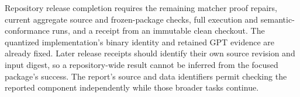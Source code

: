 Repository release completion requires the remaining matcher proof repairs, current aggregate source and frozen-package checks, full execution and semantic-conformance runs, and a receipt from an immutable clean checkout.  The quantized implementation's binary identity and retained GPT evidence are already fixed.  Later release receipts should identify their own source revision and input digest, so a repository-wide result cannot be inferred from the focused package's success.  The report's source and data identifiers permit checking the reported component independently while those broader tasks continue.

